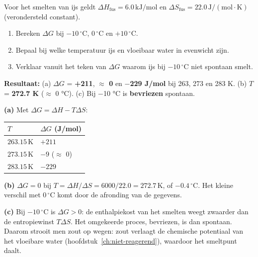\begin{oefening}
Voor het smelten van ijs geldt \(\Delta H_{\text{fus}} = 6.0\,\mathrm{kJ/mol}\) en \(\Delta S_{\text{fus}} = 22.0\,\mathrm{J/(mol\cdot K)}\) (verondersteld constant).

\begin{enumerate}
\item[(a)]
  Bereken \(\Delta G\) bij \(-10\,^\circ\mathrm{C}\), \(0\,^\circ\mathrm{C}\) en \(+10\,^\circ\mathrm{C}\).
\item[(b)]
  Bepaal bij welke temperatuur ijs en vloeibaar water in evenwicht zijn.
\item[(c)]
  Verklaar vanuit het teken van \(\Delta G\) waarom ijs bij \(-10\,^\circ\mathrm{C}\) niet spontaan smelt.
\end{enumerate}
\end{oefening}
\begin{oplossing}
\textbf{Resultaat:} (a) \(\Delta G\) = \textbf{+211}, \textbf{\ensuremath{\approx{}} 0} en \textbf{\ensuremath{-}229 J/mol} bij 263, 273 en 283 K. (b) \(T\) = \textbf{272.7 K} (\ensuremath{\approx{}} 0 °C). (c) Bij \ensuremath{-}10 °C is \textbf{bevriezen} spontaan.

\textbf{(a)} Met \(\Delta G = \Delta H - T\Delta S\):

\begin{center}
\begin{tabular}{ll}
\toprule
\(T\) & \(\Delta G\) (J/mol) \\
\midrule
\(263.15\,\mathrm{K}\) & \(+211\) \\
\(273.15\,\mathrm{K}\) & \(-9\) (\ensuremath{\approx{}} 0) \\
\(283.15\,\mathrm{K}\) & \(-229\) \\
\bottomrule
\end{tabular}
\end{center}

\textbf{(b)} \(\Delta G = 0\) bij \(T = \Delta H/\Delta S = 6000/22.0 = 272.7\,\mathrm{K}\), of \(-0.4\,^\circ\mathrm{C}\). Het kleine verschil met \(0\,^\circ\mathrm{C}\) komt door de afronding van de gegevens.

\textbf{(c)} Bij \(-10\,^\circ\mathrm{C}\) is \(\Delta G > 0\): de enthalpiekost van het smelten weegt zwaarder dan de entropiewinst \(T\Delta S\). Het omgekeerde proces, bevriezen, is dan spontaan. Daarom strooit men zout op wegen: zout verlaagt de chemische potentiaal van het vloeibare water (hoofdstuk~\ref{ch:niet-reagerend}), waardoor het smeltpunt daalt.
\end{oplossing}

